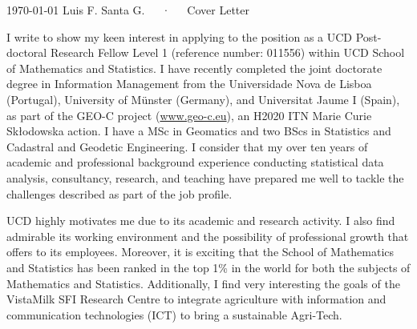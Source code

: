 \documentclass[11pt, a4paper]{awesome-cv}
\begin{document}
\makecvheader[R]

\makecvfooter
  {\today}
    {Luis F. Santa G.~~~·~~~Cover Letter}
  {}

\makelettertitle

\begin{cvletter}
I write to show my keen interest in applying to the position as a UCD Post-doctoral Research Fellow Level 1 (reference number: 011556) within UCD School of Mathematics and Statistics. I have recently completed the joint doctorate degree in Information Management from the Universidade Nova de Lisboa (Portugal), University of Münster (Germany), and Universitat Jaume I (Spain), as part of the GEO-C project (\url{www.geo-c.eu}), an H2020 ITN Marie Curie Skłodowska action. I have a MSc in Geomatics and two BScs in Statistics and Cadastral and Geodetic Engineering. I consider that my over ten years of academic and professional background experience conducting statistical data analysis, consultancy, research, and teaching have prepared me well to tackle the challenges described as part of the job profile.\par
UCD highly motivates me due to its academic and research activity. I also find admirable its working environment and the possibility of professional growth that offers to its employees. Moreover, it is exciting that the School of Mathematics and Statistics has been ranked in the top 1\% in the world for both the subjects of Mathematics and Statistics. Additionally, I find very interesting the goals of the VistaMilk SFI Research Centre to integrate agriculture with information and communication technologies (ICT) to bring a sustainable Agri-Tech.\par

\end{cvletter}
\end{document}
